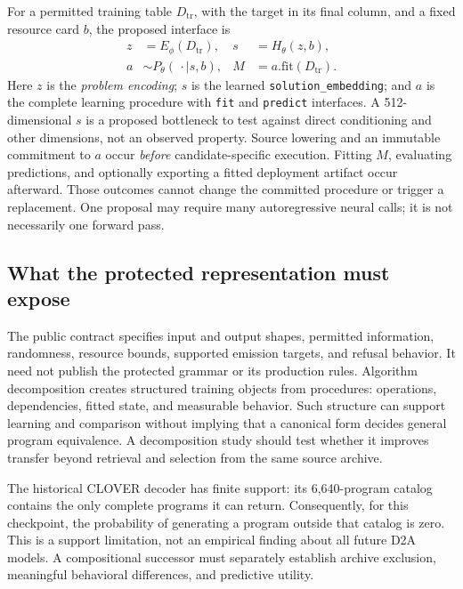 For a permitted training table $D_{\mathrm{tr}}$, with the target in its final
column, and a fixed resource card $b$, the proposed interface is
\begin{align}
 z &= E_\phi(D_{\mathrm{tr}}), &
 s &= H_\theta(z,b), \nonumber\\
 a &\sim P_\theta(\,\cdot\mid s,b), &
 M &= a.\mathrm{fit}(D_{\mathrm{tr}}). \label{eq:d2a-interface}
\end{align}
Here $z$ is the \emph{problem encoding}; $s$ is the learned
\texttt{solution\_embedding}; and $a$ is the complete learning procedure with
\texttt{fit} and \texttt{predict} interfaces. A 512-dimensional $s$ is a proposed
bottleneck to test against direct conditioning and other dimensions, not an
observed property. Source lowering and an immutable commitment to $a$ occur
\emph{before} candidate-specific execution. Fitting $M$, evaluating predictions,
and optionally exporting a fitted deployment artifact occur afterward. Those
outcomes cannot change the committed procedure or trigger a replacement.
One proposal may require many autoregressive neural calls; it is not necessarily
one forward pass.

\subsection{What the protected representation must expose}

The public contract specifies input and output shapes, permitted information,
randomness, resource bounds, supported emission targets, and refusal behavior.
It need not publish the protected grammar or its production rules. Algorithm
decomposition creates structured training objects from procedures: operations,
dependencies, fitted state, and measurable behavior. Such structure can support
learning and comparison without implying that a canonical form decides general
program equivalence. A decomposition study should test whether it improves
transfer beyond retrieval and selection from the same source archive.

The historical CLOVER decoder has finite support: its 6,640-program catalog
contains the only complete programs it can return. Consequently, for this
checkpoint, the probability of generating a program outside that catalog is
zero. This is a support limitation, not an empirical finding about all future
D2A models. A compositional successor must separately establish archive
exclusion, meaningful behavioral differences, and predictive utility.

